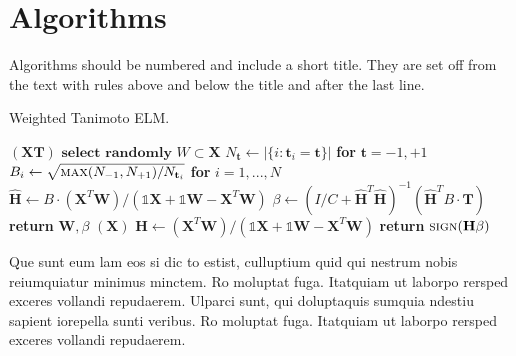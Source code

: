 \section{Algorithms}
Algorithms should be numbered and include a short title. They are set off from the text with rules above and below the title and after the last line.

\begin{algorithm}[H]
\caption{Weighted Tanimoto ELM.}\label{alg:alg1}
\begin{algorithmic}
\STATE 
{}$(\mathbf{X} \mathbf{T})$
\STATE \hspace{0.5cm}$ \textbf{select randomly } W \subset \mathbf{X}  $
\STATE \hspace{0.5cm}$ N_\mathbf{t} \gets | \{ i : \mathbf{t}_i = \mathbf{t} \} | $ \textbf{ for } $ \mathbf{t}= -1,+1 $
\STATE \hspace{0.5cm}$ B_i \gets \sqrt{ \textsc{max}(N_{-1},N_{+1}) / N_{\mathbf{t}_i} } $ \textbf{ for } $ i = 1,...,N $
\STATE \hspace{0.5cm}$ \hat{\mathbf{H}} \gets  B \cdot (\mathbf{X}^T\textbf{W})/( \mathbb{1}\mathbf{X} + \mathbb{1}\textbf{W} - \mathbf{X}^T\textbf{W} ) $
\STATE \hspace{0.5cm}$ \beta \gets \left ( I/C + \hat{\mathbf{H}}^T\hat{\mathbf{H}} \right )^{-1}(\hat{\mathbf{H}}^T B\cdot \mathbf{T})  $
\STATE \hspace{0.5cm}\textbf{return}  $\textbf{W},  \beta $
\STATE 
{}$(\mathbf{X} )$
\STATE \hspace{0.5cm}$ \mathbf{H} \gets  (\mathbf{X}^T\textbf{W} )/( \mathbb{1}\mathbf{X}  + \mathbb{1}\textbf{W}- \mathbf{X}^T\textbf{W}  ) $
\STATE \hspace{0.5cm}\textbf{return}  $\textsc{sign}( \mathbf{H} \beta )$
\end{algorithmic}
\label{alg1}
\end{algorithm}

Que sunt eum lam eos si dic to estist, culluptium quid qui nestrum nobis reiumquiatur minimus minctem. Ro moluptat fuga. Itatquiam ut laborpo rersped exceres vollandi repudaerem. Ulparci sunt, qui doluptaquis sumquia ndestiu sapient iorepella sunti veribus. Ro moluptat fuga. Itatquiam ut laborpo rersped exceres vollandi repudaerem.
